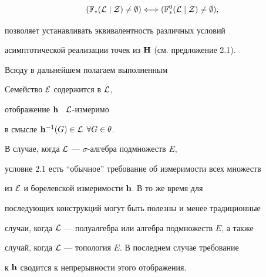 {\begin{equation}
\label{2.7}


({{\Bbb F}_*}({\cal L}\mid{\cal Z}) \ne \emp) \Longleftrightarrow


({{\Bbb F}_*^0}({\cal L}\mid{\cal Z}) \ne \emp),


\end{equation}


позволяет устанавливать эквивалентность различных условий


асимптотической реализации точек из ${\bold H}$ (см. предложение 2.1).


Всюду в дальнейшем полагаем выполненным 








\begin{conds}


Семейство ${\cal E}$ содержится в ${\cal L}$, 


отображение ${\bold h}$ \ ${\cal L}$-измеримо


в смысле ${{\bold h}^{-1}}(G)


\in {\cal L}$ \; $\fo{G} \in \theta$.


\end{conds}








\begin{notes}


В случае, когда ${\cal L}$ --- $\sigma$-алгебра подмножеств $E$,


условие 2.1 есть ``обычное'' требование об измеримости всех множеств


из ${\cal E}$ и борелевской измеримости ${\bold h}$. В то же время для


последующих конструкций могут быть полезны и менее традиционные


случаи, когда ${\cal L}$ --- полуалгебра или алгебра подмножеств $E$, а также


случай, когда ${\cal L}$ --- топология $E$. В последнем случае требование


к ${\bold h}$ сводится к непрерывности этого отображения.


\end{notes}








\begin{thms}



\end{thms}}
